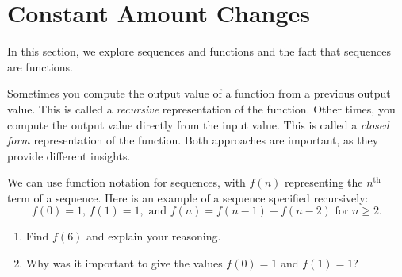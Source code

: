 \newpage
\section{Constant Amount Changes}\label{A:ConstantAmount}

In this section, we explore sequences and functions and the fact that sequences are functions. 

Sometimes you compute the output value of a function from a previous output value.  This is called a \emph{recursive} representation of the function.  Other times, you compute the output value directly from the input value.  This is called a \emph{closed form} representation of the function.  Both approaches are important, as they provide different insights.  

\begin{prob}
We can use function notation for sequences, with $f(n)$ representing the $n^\mathrm{th}$ term of a sequence.  Here is an example of a sequence specified recursively:  
$$f(0) = 1\text{, }f(1) = 1,\text{ and }f(n) = f(n-1)+f(n-2)\text{ for }n \ge 2.$$
\begin{enumerate}
\item Find $f(6)$ and explain your reasoning.  
\item Why was it important to give the values $f(0) = 1$ and $f(1) = 1$?  
\end{enumerate}
\end{prob}

